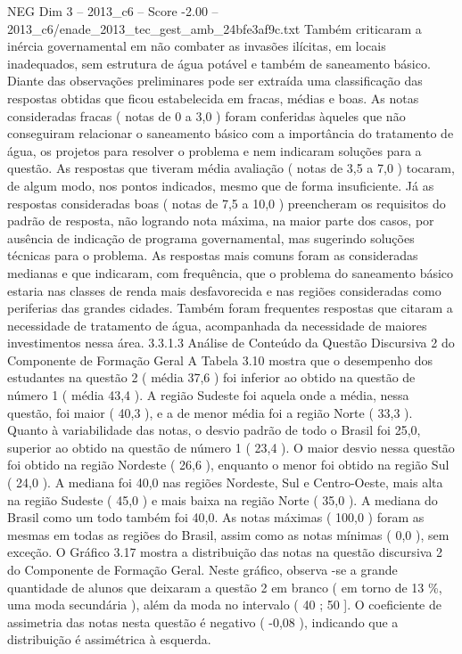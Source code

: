 \begin{textsample}{NEG Dim 3 – 2013\_c6 – Score -2.00 – 2013\_c6/enade\_2013\_tec\_gest\_amb\_24bfe3af9c.txt}
Também criticaram a inércia governamental em não combater as invasões ilícitas, em locais inadequados, sem estrutura de água potável e também de saneamento básico.
Diante das observações preliminares pode ser extraída uma classificação das respostas obtidas que ficou estabelecida em fracas, médias e boas.
As notas consideradas fracas ( notas de 0 a 3,0 ) foram conferidas àqueles que não conseguiram relacionar o saneamento básico com a importância do tratamento de água, os projetos para resolver o problema e nem indicaram soluções para a questão.
As respostas que tiveram média avaliação ( notas de 3,5 a 7,0 ) tocaram, de algum modo, nos pontos indicados, mesmo que de forma insuficiente.
Já as respostas consideradas boas ( notas de 7,5 a 10,0 ) preencheram os requisitos do padrão de resposta, não logrando nota máxima, na maior parte dos casos, por ausência de indicação de programa governamental, mas sugerindo soluções técnicas para o problema.
As respostas mais comuns foram as consideradas medianas e que indicaram, com frequência, que o problema do saneamento básico estaria nas classes de renda mais desfavorecida e nas regiões consideradas como periferias das grandes cidades.
Também foram frequentes respostas que citaram a necessidade de tratamento de água, acompanhada da necessidade de maiores investimentos nessa área. 3.3.1.3 Análise de Conteúdo da Questão Discursiva 2 do Componente de Formação Geral A Tabela 3.10 mostra que o desempenho dos estudantes na questão 2 ( média 37,6 ) foi inferior ao obtido na questão de número 1 ( média 43,4 ).
A região Sudeste foi aquela onde a média, nessa questão, foi maior ( 40,3 ), e a de menor média foi a região Norte ( 33,3 ).
Quanto à variabilidade das notas, o desvio padrão de todo o Brasil foi 25,0, superior ao obtido na questão de número 1 ( 23,4 ).
O maior desvio nessa questão foi obtido na região Nordeste ( 26,6 ), enquanto o menor foi obtido na região Sul ( 24,0 ).
A mediana foi 40,0 nas regiões Nordeste, Sul e Centro-Oeste, mais alta na região Sudeste ( 45,0 ) e mais baixa na região Norte ( 35,0 ).
A mediana do Brasil como um todo também foi 40,0.
As notas máximas ( 100,0 ) foram as mesmas em todas as regiões do Brasil, assim como as notas mínimas ( 0,0 ), sem exceção.
O Gráfico 3.17 mostra a distribuição das notas na questão discursiva 2 do Componente de Formação Geral.
Neste gráfico, observa -se a grande quantidade de alunos que deixaram a questão 2 em branco ( em torno de 13 \%, uma moda secundária ), além da moda no intervalo ( 40 ; 50 ].
O coeficiente de assimetria das notas nesta questão é negativo ( -0,08 ), indicando que a distribuição é assimétrica à esquerda.

\end{textsample}
